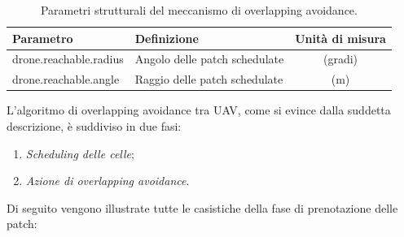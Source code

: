 \begin{table}[H]
    \centering
    \begin{tabular}{|l|l|c|}
    \hline
    \textbf{Parametro}              & \textbf{Definizione}                      & \textbf{Unità di misura}      \\ \hline
    drone.reachable.radius          & Angolo delle patch schedulate             & (gradi)                       \\ \hline
    drone.reachable.angle           & Raggio delle patch schedulate             & (m)                           \\ \hline
    \end{tabular}%
    \caption{Parametri strutturali del meccanismo di overlapping avoidance.}
    \label{tabella_obstacle_avoidance}
\end{table}

L'algoritmo di overlapping avoidance tra UAV, come si evince dalla suddetta descrizione, è suddiviso in due fasi:

\begin{enumerate}
    \item \textit{Scheduling delle celle};
    \item \textit{Azione di overlapping avoidance}.
\end{enumerate}

Di seguito vengono illustrate tutte le casistiche della fase di prenotazione delle patch:

